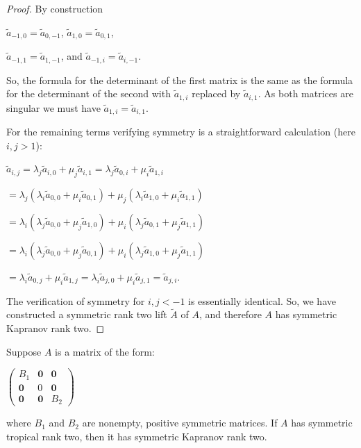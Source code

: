 \documentclass{article}
\begin{document}
\begin{proof}
  By construction 
  \begin{center}
    $\tilde{a}_{-1,0} = \tilde{a}_{0,-1}$, \hspace{.1 in} $\tilde{a}_{1,0} = \tilde{a}_{0,1}$, 
    
    $\tilde{a}_{-1,1} = \tilde{a}_{1,-1}$, \hspace{.1 in} and \hspace{.1 in} $\tilde{a}_{-1,i} = \tilde{a}_{i,-1}$. 
  \end{center}
  So, the formula for the determinant of the first matrix is the same as the formula for the determinant of the second with $\tilde{a}_{1,i}$ replaced by $\tilde{a}_{i,1}$. As both matrices are singular we must have $\tilde{a}_{1,i} = \tilde{a}_{i,1}$.
  
  For the remaining terms verifying symmetry is a straightforward calculation (here $i,j > 1$):
  \begin{center}
    $\tilde{a}_{i,j} = \lambda_{j} \tilde{a}_{i,0} + \mu_{j} \tilde{a}_{i,1} = \lambda_{j} \tilde{a}_{0,i} + \mu_{i} \tilde{a}_{1,i}$

    $= \lambda_{j} (\lambda_{i} \tilde{a}_{0,0} + \mu_{i} \tilde{a}_{0,1}) + \mu_{j} (\lambda_{i} \tilde{a}_{1,0} + \mu_{i} \tilde{a}_{1,1})$

    $= \lambda_{i} (\lambda_{j} \tilde{a}_{0,0} + \mu_{j} \tilde{a}_{1,0}) + \mu_{i} (\lambda_{j} \tilde{a}_{0,1} + \mu_{j} \tilde{a}_{1,1})$

    $= \lambda_{i} (\lambda_{j} \tilde{a}_{0,0} + \mu_{j} \tilde{a}_{0,1}) + \mu_{i} (\lambda_{j} \tilde{a}_{1,0} + \mu_{j} \tilde{a}_{1,1})$

    $= \lambda_{i} \tilde{a}_{0,j} + \mu_{i} \tilde{a}_{1,j} = \lambda_{i} \tilde{a}_{j,0} + \mu_{i} \tilde{a}_{j,1} = \tilde{a}_{j,i}$.
    
  \end{center}
  The verification of symmetry for $i,j < -1$ is essentially identical. So, we have constructed a symmetric rank two lift $\tilde{A}$ of $A$, and therefore $A$ has symmetric Kapranov rank two.
\end{proof}

\begin{lem}
  Suppose $A$ is a matrix of the form:  
  \begin{center}  
    $\left(\begin{array}{ccc} B_{1} & \textbf{0} & \textbf{0} \\ \textbf{0} & 0 & \textbf{0} \\ \textbf{0} & \textbf{0} & B_{2}\end{array}\right)$
  \end{center}
  where $B_{1}$ and $B_{2}$ are nonempty, positive symmetric matrices. If $A$ has symmetric tropical rank two, then it has symmetric Kapranov rank two.
\end{lem}
\end{document}
